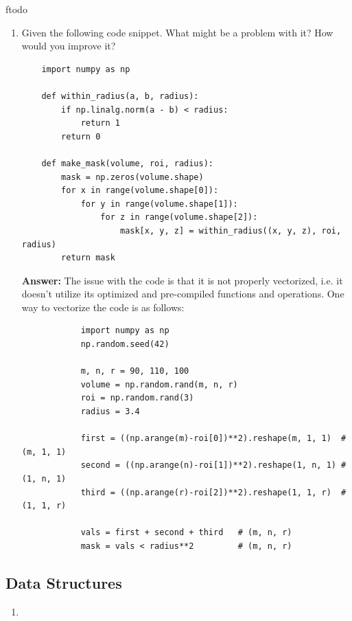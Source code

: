 ƒtodo\documentclass{article}
\newenvironment{QandA}{\begin{enumerate}[label=\arabic*.]}{\end{enumerate}}
\newenvironment{answer}{\par\normalfont \textbf{Answer:}}{}
\begin{document}
\begin{QandA}
\begin{answer}
        (Source: \href{https://hangzhang.org/PyTorch-Encoding/tutorials/syncbn.html}{Hang Zhang's blog})
    \end{answer}

    \item Given the following code snippet. What might be a problem with it? How would you improve it?

    \begin{lstlisting}
    import numpy as np
    
    def within_radius(a, b, radius):
        if np.linalg.norm(a - b) < radius:
            return 1
        return 0
    
    def make_mask(volume, roi, radius):
        mask = np.zeros(volume.shape)
        for x in range(volume.shape[0]):
            for y in range(volume.shape[1]):
                for z in range(volume.shape[2]):
                    mask[x, y, z] = within_radius((x, y, z), roi, radius)
        return mask
    \end{lstlisting}
    
    \begin{answer}
        The issue with the code is that it is not properly vectorized, i.e. it doesn't utilize its optimized and pre-compiled functions and operations. One way to vectorize the code is as follows:
        \begin{lstlisting}
            import numpy as np
            np.random.seed(42)
            
            m, n, r = 90, 110, 100
            volume = np.random.rand(m, n, r)
            roi = np.random.rand(3)
            radius = 3.4
            
            first = ((np.arange(m)-roi[0])**2).reshape(m, 1, 1)  # (m, 1, 1)
            second = ((np.arange(n)-roi[1])**2).reshape(1, n, 1) # (1, n, 1)
            third = ((np.arange(r)-roi[2])**2).reshape(1, 1, r)  # (1, 1, r)
            
            vals = first + second + third   # (m, n, r)
            mask = vals < radius**2         # (m, n, r)
        \end{lstlisting}
        
    \end{answer}
    
\end{QandA}

\subsection{Data Structures}
\begin{QandA}
    \item 
\end{QandA}
\end{document}
